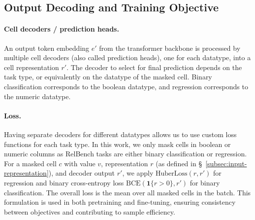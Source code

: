 \subsection{Output Decoding and Training Objective}

\paragraph{Cell decoders / prediction heads.}
An output token embedding $e'$ from the transformer backbone
is processed by multiple cell decoders (also called prediction heads),
one for each datatype, into a cell representation $r'$.
The decoder to select for final prediction depends on the task type,
or equivalently on the datatype of the masked cell.
Binary classification corresponds to the boolean datatype,
and regression corresponds to the numeric datatype.

\paragraph{Loss.}
Having separate decoders for different datatypes
allows us to use custom loss functions for each task type.
In this work, we only mask cells in boolean or numeric columns
as RelBench tasks are either binary classification or regression.
For a masked cell $c$ with value $v$, representation $r$ (as defined in \S~\ref{subsec:input-representation}), and decoder output $r'$, 
we apply $\text{HuberLoss}(r, r')$ for regression and
binary cross-entropy loss $\text{BCE}(\mathbf{1}{\{r > 0\}}, r')$ for binary classification.
The overall loss is the mean over all masked cells in the batch.  
This formulation is used in both pretraining and fine-tuning, ensuring consistency between objectives and contributing to sample efficiency.





